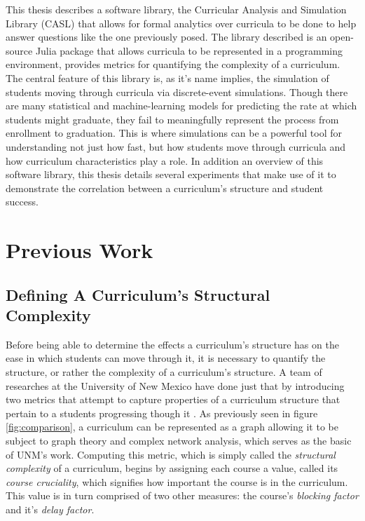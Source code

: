 \documentclass[botnum, fleqn]{unmeethesis}
\begin{document}
  This thesis describes a software library, the Curricular Analysis and Simulation Library (CASL) that allows for formal analytics over curricula to be done to help answer questions like the one previously posed. The library described is an open-source Julia package that allows curricula to be represented in a programming environment, provides metrics for quantifying the complexity of a curriculum. The central feature of this library is, as it's name implies, the simulation of students moving through curricula via discrete-event simulations. Though there are many statistical and machine-learning models for predicting the rate at which students might graduate, they fail to meaningfully represent the process from enrollment to graduation. This is where simulations can be a powerful tool for understanding not just how fast, but how students move through curricula and how curriculum characteristics play a role. In addition an overview of this software library, this thesis details several experiments that make use of it to demonstrate the correlation between a curriculum's structure and student success.


\chapter{Previous Work}

  \section{Defining A Curriculum's Structural Complexity}
    Before being able to determine the effects a curriculum's structure has on the ease in which students can move through it, it is necessary to quantify the structure, or rather the complexity of a curriculum's structure. A team of researches at the University of New Mexico have done just that by introducing two metrics that attempt to capture properties of a curriculum structure that pertain to a students progressing though it \cite{complexity}. As previously seen in figure \ref{fig:comparison}, a curriculum can be represented as a graph allowing it to be subject to graph theory and complex network analysis, which serves as the basic of UNM's work. Computing this metric, which is simply called the \textit{structural complexity} of a curriculum, begins by assigning each course a value, called its \textit{course cruciality}, which signifies how important the course is in the curriculum. This value is in turn comprised of two other measures: the course's \textit{blocking factor} and it's \textit{delay factor}.
\end{document}
